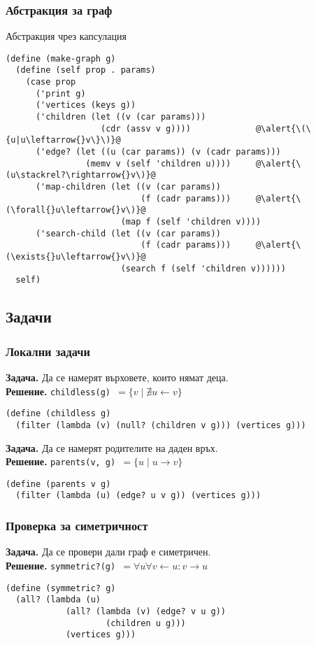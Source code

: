 \documentclass[alsotrans]{beamerswitch}
\begin{document}
\begin{frame}[fragile]
  \frametitle{Абстракция за граф}

  \sizeboth\footnotesize
  Абстракция чрез капсулация
  \vspace{-.3ex}
\begin{lstlisting}
(define (make-graph g)
  (define (self prop . params)
    (case prop
      ('print g)
      ('vertices (keys g))
      ('children (let ((v (car params)))
                   (cdr (assv v g))))             @\alert{\(\{u|u\leftarrow{}v\}\)}@
      ('edge? (let ((u (car params)) (v (cadr params)))
                (memv v (self 'children u))))     @\alert{\(u\stackrel?\rightarrow{}v\)}@
      ('map-children (let ((v (car params))
                           (f (cadr params)))     @\alert{\(\forall{}u\leftarrow{}v\)}@
                       (map f (self 'children v))))
      ('search-child (let ((v (car params))
                           (f (cadr params)))     @\alert{\(\exists{}u\leftarrow{}v\)}@
                       (search f (self 'children v))))))
  self)
\end{lstlisting}
\end{frame}

\subsection{Задачи}

\begin{frame}[fragile]
  \frametitle{Локални задачи}

  \small
  \textbf{Задача. }Да се намерят върховете, които нямат деца.\\
  \pause
  \textbf{Решение. }\tt{childless(g)} $ = \{v\;|\;\nexists u \leftarrow v \}$
  \pause
\begin{lstlisting}
(define (childless g)
  (filter (lambda (v) (null? (children v g))) (vertices g)))
\end{lstlisting}
  \pause
  \vspace{2ex}
  \textbf{Задача. }Да се намерят родителите на даден връх.\\
  \pause
  \textbf{Решение. }\tt{parents(v, g)} $ = \{u\;|\;u \rightarrow v \}$
  \pause
\begin{lstlisting}
(define (parents v g)
  (filter (lambda (u) (edge? u v g)) (vertices g)))
\end{lstlisting}
\end{frame}

\begin{frame}[fragile]
  \frametitle{Проверка за симетричност}
  \textbf{Задача. }Да се провери дали граф е симетричен.\\
  \pause
  \textbf{Решение. }\tt{symmetric?(g)} $ = \forall u\forall v\leftarrow u: v\rightarrow u$
  \pause
\begin{lstlisting}
(define (symmetric? g)
  (all? (lambda (u)
            (all? (lambda (v) (edge? v u g))
                    (children u g)))
            (vertices g)))
\end{lstlisting}
\end{frame}
\end{document}
